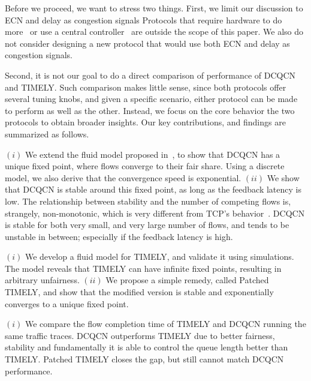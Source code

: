 
Before we proceed, we want to stress two things.  First, we limit our discussion
to ECN and delay as congestion signals  Protocols 
that require hardware to do more~\cite{pfabric,rcp,katabi2002congestion} or use a central
controller~\cite{perry2014fastpass,deadline} are outside the scope of this
paper. We also do not consider designing a new protocol that
would use both ECN and delay as congestion signals. 

Second, it is not our goal to do a direct comparison of performance of DCQCN and
TIMELY.  Such comparison makes little sense, since both protocols offer several
tuning knobs, and given a specific scenario, either protocol can be made to
perform as well as the other. Instead, we focus on the core behavior the two
protocols to obtain broader insights.  Our key contributions, and findings are
summarized as follows.

 $(i)$ We extend the fluid model proposed in~\cite{dcqcn}, to show
that DCQCN has a unique fixed point, where flows converge to their fair share.
Using a discrete model, we also derive that the convergence speed is exponential.
$(ii)$ We show that DCQCN is stable around this fixed point, as long as the
feedback latency is low. The relationship between stability and the number of
competing flows is, strangely, non-monotonic, which is very different from TCP's
behavior~\cite{misra:TAC2002}. DCQCN is stable for both very small, and very
large number of flows, and tends to be unstable in between; especially if the
feedback latency is high.

 $(i)$ We develop a fluid model for TIMELY, and validate it using
simulations. The model reveals that TIMELY can have infinite fixed points,
resulting in arbitrary unfairness.  $(ii)$ We propose a simple remedy, called Patched TIMELY, and show
that the modified version is stable and exponentially converges to a unique fixed 
point. 

 $(i)$ We compare the flow completion time of TIMELY and 
DCQCN running the same traffic traces. DCQCN outperforms TIMELY
due to better fairness, stability and fundamentally it is able to
control the queue length better than TIMELY. Patched TIMELY closes the gap, but 
still cannot match DCQCN performance. 

